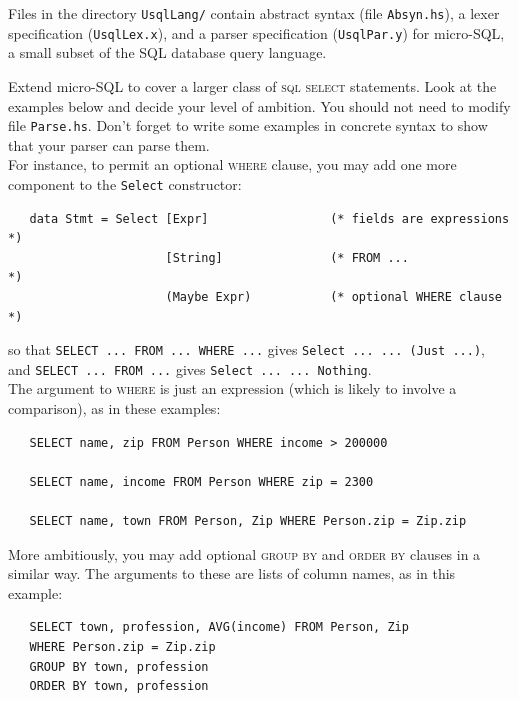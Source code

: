 \documentclass[a4paper]{article}
\begin{document}
\begin{exercise}\label{exer-usql-parse-def}
    Files in the directory \texttt{UsqlLang/} contain 
  abstract syntax (file \texttt{Absyn.hs}), a lexer specification (\texttt{UsqlLex.x}),
  and a parser specification (\texttt{UsqlPar.y}) for micro-SQL, a
  small subset of the SQL database query language. 
  
  Extend micro-SQL to cover a larger class of \textsc{sql select}
  statements.  Look at the examples below and decide your level of
  ambition.  You should not need to modify file \texttt{Parse.hs}. 
  Don't forget to write some examples in concrete syntax to show that
  your parser can parse them. \\
  
  \noindent
  For instance, to permit an optional \textsc{where} clause, you may
  add one more component to the \texttt{Select} constructor:

{\codesetup\begin{verbatim}
   data Stmt = Select [Expr]                 (* fields are expressions *)
                      [String]               (* FROM ...               *)
                      (Maybe Expr)           (* optional WHERE clause  *)
\end{verbatim}}

\noindent
so that \verb+SELECT ... FROM ... WHERE ...+
gives \texttt{Select ... ... (Just ...)},\\
and \verb+SELECT ... FROM ...+ gives \texttt{Select ... ...
  Nothing}. \\
  
\noindent
The argument to \textsc{where} is just an expression (which is likely
to involve a comparison), as in these examples:

{\codesetup\begin{verbatim}
   SELECT name, zip FROM Person WHERE income > 200000

   SELECT name, income FROM Person WHERE zip = 2300

   SELECT name, town FROM Person, Zip WHERE Person.zip = Zip.zip
\end{verbatim}}

\noindent 
More ambitiously, you may add optional \textsc{group by} and
\textsc{order by} clauses in a similar way.  The arguments to these
are lists of column names, as in this example:

{\codesetup\begin{verbatim}
   SELECT town, profession, AVG(income) FROM Person, Zip 
   WHERE Person.zip = Zip.zip 
   GROUP BY town, profession 
   ORDER BY town, profession
\end{verbatim}}


\end{exercise}
\end{document}
